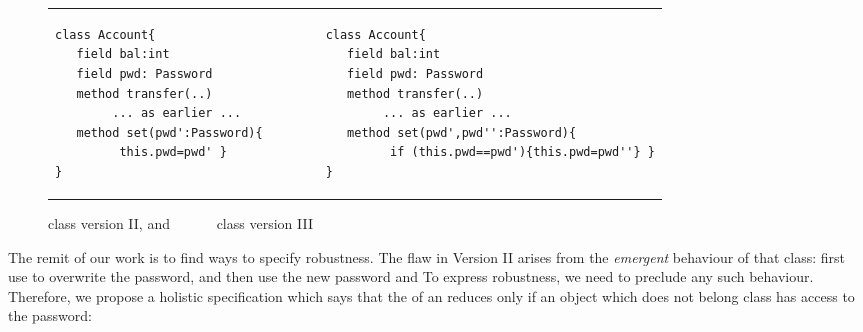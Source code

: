 %
  
  
 
 \begin{figure}[hbtp]
 \begin{tabular}{lll}
\begin{minipage}{0.35\textwidth}
\begin{lstlisting}
class Account{
   field bal:int 
   field pwd: Password 
   method transfer(..) 
        ... as earlier ...
   method set(pwd':Password){
         this.pwd=pwd' }
}   
\end{lstlisting}
\end{minipage}
  &\ \ \  \ \   &
\begin{minipage}{0.50\textwidth}
\begin{lstlisting}
class Account{
   field bal:int 
   field pwd: Password 
   method transfer(..) 
        ... as earlier ...
   method set(pwd',pwd'':Password){
         if (this.pwd==pwd'){this.pwd=pwd''} }
}
\end{lstlisting}
\end{minipage} 
 \end{tabular}
  \caption{class  version II, and \ \ \ \ \ \  class  version III}
 \label{fig:ExampleAccount}
 \end{figure}

 
 The remit of our work is to find ways to specify robustness. 
 The flaw in Version II arises from the \emph{emergent} behaviour of that class: first use  
 to overwrite the
 password, and then use the new password and    
 To express robustness, we need to preclude any such behaviour.
 Therefore, we propose a holistic specification which says that
 the  of an  reduces only if an object which does not belong
 class  has access to the password:
 
